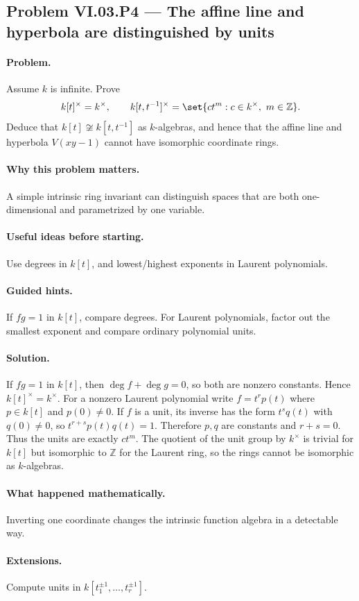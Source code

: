 \subsection*{Problem VI.03.P4 --- The affine line and hyperbola are distinguished by units}
\label{prob:vi03-p4}
\paragraph{Problem.}
Assume \(k\) is infinite.  Prove
\[
k[t]^\times=k^\times,
\qquad
k[t,t^{-1}]^\times=\set{ct^m:c\in k^\times,\ m\in\mathbb Z}.
\]
Deduce that \(k[t]\not\cong k[t,t^{-1}]\) as \(k\)-algebras, and hence that the affine
line and hyperbola \(V(xy-1)\) cannot have isomorphic coordinate rings.
\ifdefined\FullProblemDossiers
\paragraph{Why this problem matters.} A simple intrinsic ring invariant can distinguish spaces that are both one-dimensional and parametrized by one variable.
\paragraph{Useful ideas before starting.} Use degrees in \(k[t]\), and lowest/highest exponents in Laurent polynomials.
\paragraph{Guided hints.} If \(fg=1\) in \(k[t]\), compare degrees.  For Laurent polynomials, factor out the smallest exponent and compare ordinary polynomial units.
\paragraph{Solution.}
If \(fg=1\) in \(k[t]\), then \(\deg f+\deg g=0\), so both are nonzero constants.  Hence
\(k[t]^\times=k^\times\).  For a nonzero Laurent polynomial write \(f=t^r p(t)\) where
\(p\in k[t]\) and \(p(0)\neq0\).  If \(f\) is a unit, its inverse has the form \(t^s q(t)\)
with \(q(0)\neq0\), so \(t^{r+s}p(t)q(t)=1\).  Therefore \(p,q\) are constants and
\(r+s=0\).  Thus the units are exactly \(ct^m\).  The quotient of the unit group by
\(k^\times\) is trivial for \(k[t]\) but isomorphic to \(\mathbb Z\) for the Laurent ring,
so the rings cannot be isomorphic as \(k\)-algebras.
\paragraph{What happened mathematically.} Inverting one coordinate changes the intrinsic function algebra in a detectable way.
\paragraph{Extensions.} Compute units in \(k[t_1^{\pm1},\dots,t_r^{\pm1}]\).
\fi
